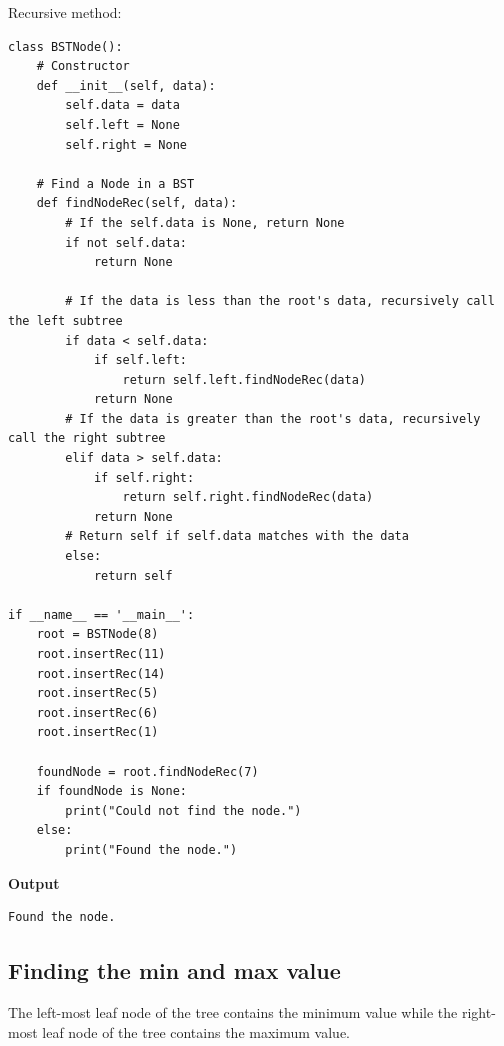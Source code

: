 \documentclass[a4paper,11pt]{book}
\begin{document}
\noindent Recursive method:

\begin{lstlisting}
class BSTNode():
    # Constructor
    def __init__(self, data):
        self.data = data
        self.left = None
        self.right = None
       
    # Find a Node in a BST 
    def findNodeRec(self, data):
        # If the self.data is None, return None
        if not self.data:
            return None

        # If the data is less than the root's data, recursively call the left subtree
        if data < self.data:
            if self.left:
                return self.left.findNodeRec(data)
            return None
        # If the data is greater than the root's data, recursively call the right subtree
        elif data > self.data:
            if self.right:
                return self.right.findNodeRec(data)
            return None
        # Return self if self.data matches with the data
        else:
            return self
        
if __name__ == '__main__':
    root = BSTNode(8)
    root.insertRec(11)
    root.insertRec(14)
    root.insertRec(5)
    root.insertRec(6)
    root.insertRec(1)
    
    foundNode = root.findNodeRec(7)
    if foundNode is None:
        print("Could not find the node.")
    else:
        print("Found the node.")
\end{lstlisting}
\textbf{Output}
\begin{lstlisting}
Found the node.
\end{lstlisting}

\subsection{Finding the min and max value}

\noindent The left-most leaf node of the tree contains the minimum value while the right-most leaf node of the tree contains the maximum value.
\end{document}
